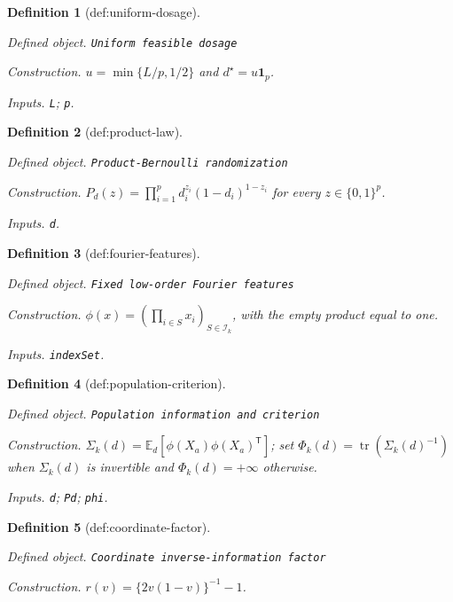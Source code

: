 \documentclass{article}
\newtheorem{definition}{Definition}
\begin{document}
\begin{definition}[def:uniform-dosage]\label{def:uniform-dosage}
\par\smallskip\noindent\emph{Defined object.} \texttt{Uniform feasible dosage}
\par\smallskip\noindent\emph{Construction.} \(u=\min\{L/p,1/2\}\) and \(d^\star=u\mathbf 1_p\).
\par\smallskip\noindent\emph{Inputs.} \texttt{L}; \texttt{p}.
\end{definition}

\begin{definition}[def:product-law]\label{def:product-law}
\par\smallskip\noindent\emph{Defined object.} \texttt{Product-\allowbreak{}Bernoulli randomization}
\par\smallskip\noindent\emph{Construction.} \(P_d(z)=\prod_{i=1}^p d_i^{z_i}(1-d_i)^{1-z_i}\) for every \(z\in\{0,1\}^p\).
\par\smallskip\noindent\emph{Inputs.} \texttt{d}.
\end{definition}

\begin{definition}[def:fourier-features]\label{def:fourier-features}
\par\smallskip\noindent\emph{Defined object.} \texttt{Fixed low-\allowbreak{}order Fourier features}
\par\smallskip\noindent\emph{Construction.} \(\phi(x)=(\prod_{i\in S}x_i)_{S\in\mathcal I_k}\), with the empty product equal to one.
\par\smallskip\noindent\emph{Inputs.} \texttt{indexSet}.
\end{definition}

\begin{definition}[def:population-criterion]\label{def:population-criterion}
\par\smallskip\noindent\emph{Defined object.} \texttt{Population information and criterion}
\par\smallskip\noindent\emph{Construction.} \(\Sigma_k(d)=\mathbb E_d[\phi(X_a)\phi(X_a)^{\mathsf T}]\); set \(\Phi_k(d)=\operatorname{tr}(\Sigma_k(d)^{-1})\) when \(\Sigma_k(d)\) is invertible and \(\Phi_k(d)=+\infty\) otherwise.
\par\smallskip\noindent\emph{Inputs.} \texttt{d}; \texttt{Pd}; \texttt{phi}.
\end{definition}

\begin{definition}[def:coordinate-factor]\label{def:coordinate-factor}
\par\smallskip\noindent\emph{Defined object.} \texttt{Coordinate inverse-\allowbreak{}information factor}
\par\smallskip\noindent\emph{Construction.} \(r(v)=\{2v(1-v)\}^{-1}-1\).
\end{definition}
\end{document}
